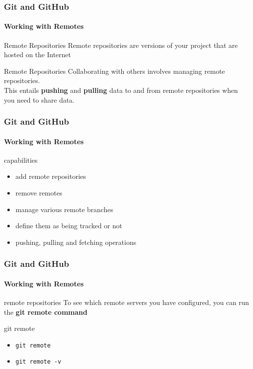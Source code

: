 \begin{frame}
	\frametitle{Git and GitHub}
    \framesubtitle{Working with Remotes}
    \addtocounter{nframe}{1}

	\begin{block}{Remote Repositories}
		Remote repositories are versions of your project that are hosted on the Internet
	\end{block}

	\begin{block}{Remote Repositories}
		Collaborating with others involves managing remote repositories. \\
		This entails \textbf{pushing} and \textbf{pulling} data to and from remote repositories when you need to share data.
	\end{block}

\end{frame}

\begin{frame}
	\frametitle{Git and GitHub}
    \framesubtitle{Working with Remotes}
    \addtocounter{nframe}{1}

	\begin{block}{capabilities}
		\begin{itemize}
			\item add remote repositories
			\item remove remotes
			\item manage various remote branches
			\item define them as being tracked or not
			\item pushing, pulling and fetching operations
		\end{itemize}
	\end{block}

\end{frame}

\begin{frame}
	\frametitle{Git and GitHub}
    \framesubtitle{Working with Remotes}
    \addtocounter{nframe}{1}

	\begin{block}{remote repositories}
		To see which remote servers you have configured, you can run the \textbf{git remote command}
	\end{block}

	\begin{block}{git remote}
		\begin{itemize}
			\item \texttt{git remote}
			\item \texttt{git remote -v}
		\end{itemize}
	\end{block}

\end{frame}

